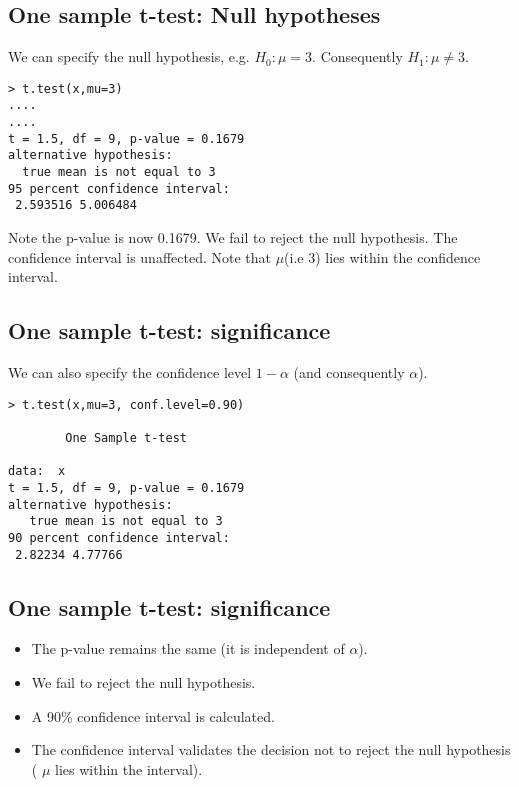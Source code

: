 \documentclass[a4paper,12pt]{article}
\begin{document}
\subsection{One sample t-test: Null hypotheses}
We can specify the null hypothesis, e.g. $H_{0}: \mu = 3$. Consequently $H_{1}: \mu \neq 3$.
\begin{verbatim}
> t.test(x,mu=3)
....
....
t = 1.5, df = 9, p-value = 0.1679
alternative hypothesis:
  true mean is not equal to 3
95 percent confidence interval:
 2.593516 5.006484

\end{verbatim}
Note the p-value is now 0.1679. We fail to reject the null hypothesis.
The confidence interval is unaffected. Note that $\mu$(i.e 3) lies within the confidence interval.

\subsection{One sample t-test: significance}
We can also specify the confidence level $1-\alpha$ (and consequently $\alpha$).
\begin{verbatim}
> t.test(x,mu=3, conf.level=0.90)

        One Sample t-test

data:  x
t = 1.5, df = 9, p-value = 0.1679
alternative hypothesis:
   true mean is not equal to 3
90 percent confidence interval:
 2.82234 4.77766

\end{verbatim}
\subsection{One sample t-test: significance}
\begin{itemize}

\item The p-value remains the same (it is independent of $\alpha$).
\item We fail to reject the null hypothesis.
\item A 90\% confidence interval is calculated.
\item The confidence interval validates the decision not to reject the null
hypothesis ( $\mu$ lies within the interval).
\end{itemize}


\end{document}
